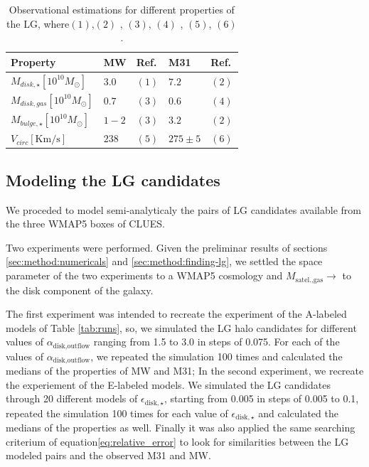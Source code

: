 \documentclass[usenatbib]{mn2e}
\begin{document}
\begin{table}
\centering
\begin{tabular}{|l|l|l|l|l|}
\hline
\hline
 Property &  MW &  Ref. & M31 & Ref.\\
\hline
$M_{disk,\star}[10^{10}M_{\odot}]$ & $3.0 $ &  $(1)$ & $7.2$ & $(2)$ \\
$M_{disk,gas}[10^{10}M_{\odot}]$ & $0.7$ &  $(3)$ & $0.6$ &  $(4)$ \\
$M_{bulge,\star}[10^{10}M_{\odot}]$ & $1-2$ & $(3)$ & $3.2$ &  $(2)$ \\
$V_{circ}[\text{Km/s}]$ & $238$ &  $(5)$ & $275\pm 5$ & $(6)$ \\
\hline
\hline
\end{tabular}
\caption{Observational estimations for different properties of the LG,
  where$(1)$\citet{2001ApJ...555..393Z},$(2)$
  \citet{2006MNRAS.366..996G}, $(3)$\citet{2009A&A...505..497Y}, $(4)$
  \citet{2006A&A...453..459N}, $(5)$\citet{2005MNRAS.364..433B},
  $(6)$\citet{2008MNRAS.389.1911S}.} 
\label{tab:lg-observations}
\end{table}

\subsection{Modeling the LG candidates}
\label{sec:modeling-lg}
We proceded to model semi-analyticaly the  pairs of LG candidates
available from the three WMAP5 boxes of CLUES. 

Two experiments were performed. Given the preliminar results of
sections \ref{sec:method:numericals} and \ref{sec:method:finding-lg},
we settled the space parameter of the two experiments to a WMAP5
cosmology and $M_{\text{satel.,gas}}\to$ to the disk component of the
galaxy. 

The first experiment was intended to recreate the experiment of the
A-labeled models of Table \ref{tab:runs}, so, we simulated the LG halo
candidates for different values of $\alpha_{\text{disk,outflow}}$
ranging from 1.5  to 3.0 in steps of 0.075. For each of the values of
$\alpha_{\text{disk,outflow}}$, we repeated the simulation 100 times
and calculated the medians of the properties of MW and M31; In the
second experiment, we recreate the experiement of the E-labeled
models.  We simulated the LG candidates through 20 different models of
$\epsilon_{\text{disk},\star}$, starting from 0.005 in steps of 0.005
to 0.1, repeated the simulation 100 times for each value of
$\epsilon_{\text{disk},\star}$ and calculated the medians of the
properties as well. Finally  it was also applied the same searching
criterium of equation\ref{eq:relative_error} to look for similarities
between the LG modeled pairs and the observed M31 and MW. 
\end{document}
